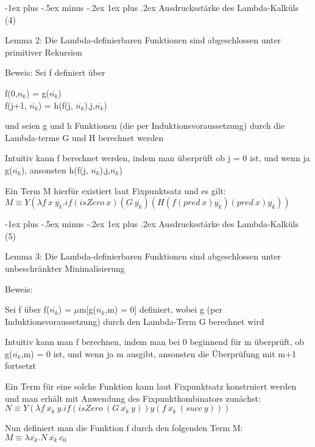 \documentclass[10pt]{article}
\makeatletter
\renewcommand{\subsubsection}{\@startsection{subsubsection}{3}{0mm}%
                                {-1ex plus -.5ex minus -.2ex}%
                                {1ex plus .2ex}%
                                {\normalfont\small\bfseries}}
\makeatother
\begin{document}
\begin{itemize*}
\subsubsection{Ausdrucksstärke des Lambda-Kalküls (4)}
\begin{itemize*}
  \item  \color{blue} Lemma 2: Die Lambda-definierbaren Funktionen sind abgeschlossen unter primitiver Rekursion \color{black}
  \item Beweis: Sei f definiert über
  \begin{center}
    f(0,$\overline{n_k}$) = g($\overline{n_k}$)\\
    f(j+1, $\overline{n_k}$) = h(f(j, $\overline{n_k}$),j,$\overline{n_k}$)
  \end{center}
  und seien g und h Funktionen (die per Induktionsvoraussetzung) durch die Lambda-terme G und H berechnet werden
  \begin{itemize*}
    \item Intuitiv kann f berechnet werden, indem man überprüft ob j = 0 ist, und wenn ja g($\overline{n_k}$), ansonsten h(f(j, $\overline{n_k}$),j,$\overline{n_k}$)
    \item Ein Term M hierfür existiert laut Fixpunktsatz und es gilt:
    $M \equiv Y (\lambda f\:x\: \overline{y_k}.if(isZero \: x)(G\:\overline{y_k})(H(f(pred\: x)\overline{y_k})(pred \: x)\overline{y_k}))$
  \end{itemize*}
\end{itemize*}
\subsubsection{Ausdrucksstärke des Lambda-Kalküls (5)}
\begin{itemize*}
  \item \color{blue} Lemma 3: Die Lambda-definierbaren Funktionen sind abgeschlossen unter unbeschränkter Minimalisierung \color{black}
  \item Beweis:
  \begin{itemize*}
    \item Sei f über f($\overline{n_k}$) = $\mu$m[g($\overline{n_k}$,m) = 0] definiert, wobei g (per Induktionsvoraussetzung) durch den Lambda-Term G berechnet wird
    \item Intuitiv kann man f berechnen, indem man bei 0 beginnend für m überprüft, ob g($\overline{n_k}$,m) = 0 ist, und wenn ja m ausgibt, ansonsten die Überprüfung mit m+1 fortsetzt
    \item Ein Term für eine solche Funktion kann laut Fixpunktsatz konstruiert werden und man erhält mit Anwendung des Fixpunktkombinators zunächst: \\
    $N \equiv Y (\lambda f \: \overline{x_k} \: y. if(isZero \: (G \: \overline{x_k} \: y))y(f\:\overline{x_k}\:(succ \: y)))$
    \item Nun definiert man die Funktion f durch den folgenden Term M: \\
    $M \equiv \lambda \overline{x_k}.N \: \overline{x_k} \: c_0$
  \end{itemize*}
\end{itemize*}


\end{itemize*}
\end{document}
